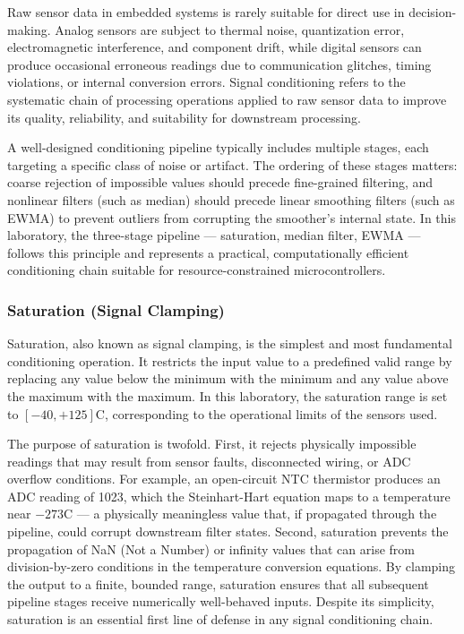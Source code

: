Raw sensor data in embedded systems is rarely suitable for direct use in decision-making. Analog sensors are subject to thermal noise, quantization error, electromagnetic interference, and component drift, while digital sensors can produce occasional erroneous readings due to communication glitches, timing violations, or internal conversion errors. Signal conditioning refers to the systematic chain of processing operations applied to raw sensor data to improve its quality, reliability, and suitability for downstream processing.

A well-designed conditioning pipeline typically includes multiple stages, each targeting a specific class of noise or artifact. The ordering of these stages matters: coarse rejection of impossible values should precede fine-grained filtering, and nonlinear filters (such as median) should precede linear smoothing filters (such as EWMA) to prevent outliers from corrupting the smoother's internal state. In this laboratory, the three-stage pipeline --- saturation, median filter, EWMA --- follows this principle and represents a practical, computationally efficient conditioning chain suitable for resource-constrained microcontrollers.

\subsubsection{Saturation (Signal Clamping)}

Saturation, also known as signal clamping, is the simplest and most fundamental conditioning operation. It restricts the input value to a predefined valid range by replacing any value below the minimum with the minimum and any value above the maximum with the maximum. In this laboratory, the saturation range is set to $[-40, +125]$\textdegree C, corresponding to the operational limits of the sensors used.

The purpose of saturation is twofold. First, it rejects physically impossible readings that may result from sensor faults, disconnected wiring, or ADC overflow conditions. For example, an open-circuit NTC thermistor produces an ADC reading of 1023, which the Steinhart-Hart equation maps to a temperature near $-273$\textdegree C --- a physically meaningless value that, if propagated through the pipeline, could corrupt downstream filter states. Second, saturation prevents the propagation of NaN (Not a Number) or infinity values that can arise from division-by-zero conditions in the temperature conversion equations. By clamping the output to a finite, bounded range, saturation ensures that all subsequent pipeline stages receive numerically well-behaved inputs. Despite its simplicity, saturation is an essential first line of defense in any signal conditioning chain.

